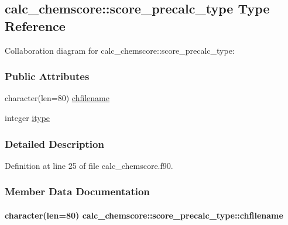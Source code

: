 \hypertarget{structcalc__chemscore_1_1score__precalc__type}{\subsection{calc\-\_\-chemscore\-:\-:score\-\_\-precalc\-\_\-type Type Reference}
\label{structcalc__chemscore_1_1score__precalc__type}
}


Collaboration diagram for calc\-\_\-chemscore\-:\-:score\-\_\-precalc\-\_\-type\-:
\subsubsection*{Public Attributes}
\begin{DoxyCompactItemize}
\item 
character(len=80) \hyperlink{structcalc__chemscore_1_1score__precalc__type_ab013ebbe98e9620a70428fd3fed112e9}{chfilename}
\item 
integer \hyperlink{structcalc__chemscore_1_1score__precalc__type_acf3304a666672e5e7ba6470e3947c038}{itype}
\end{DoxyCompactItemize}


\subsubsection{Detailed Description}


Definition at line 25 of file calc\-\_\-chemscore.\-f90.



\subsubsection{Member Data Documentation}
\hypertarget{structcalc__chemscore_1_1score__precalc__type_ab013ebbe98e9620a70428fd3fed112e9}{
\paragraph[{chfilename}]{\setlength{\rightskip}{0pt plus 5cm}character(len=80) calc\-\_\-chemscore\-::score\-\_\-precalc\-\_\-type\-::chfilename}}\label{structcalc__chemscore_1_1score__precalc__type_ab013ebbe98e9620a70428fd3fed112e9}


